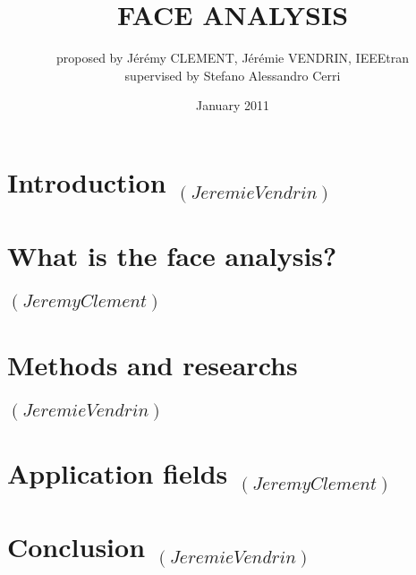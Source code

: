 \documentclass[a4paper, 11pt,twocolumn]{IEEEtran}
\date{January 2011}
\title{FACE ANALYSIS}
\author{proposed by Jérémy CLEMENT, Jérémie VENDRIN, IEEEtran\\ supervised by Stefano Alessandro Cerri }
\begin{document}
	\maketitle
	\thispagestyle{fancy}
	
	\begin{abstract}
		
	\end{abstract}

	\section{Introduction $_{(Jeremie Vendrin)}$}
	

	\section{What is the face analysis? $_{(Jeremy Clement)}$}
	

	\section{Methods and researchs $_{(Jeremie Vendrin)}$}
	

	\section{Application fields $_{(Jeremy Clement)}$}
	

	\section*{Conclusion $_{(Jeremie Vendrin)}$}
	

	
	
\end{document}
